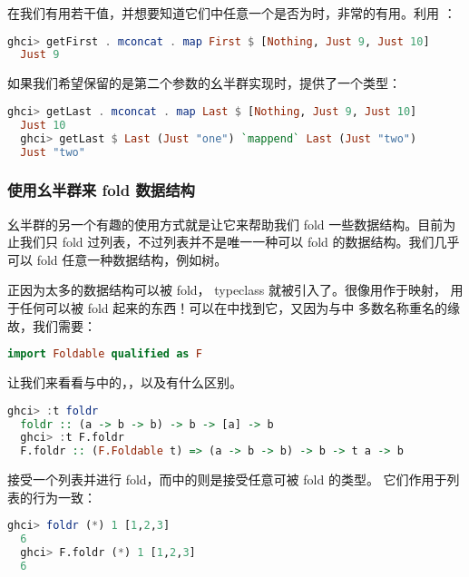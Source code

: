 \documentclass[./main.tex]{subfiles}
\begin{document}
在我们有用若干值，并想要知道它们中任意一个是否为时，非常的有用。利用
：

\begin{lstlisting}[language=Haskell]
  ghci> getFirst . mconcat . map First $ [Nothing, Just 9, Just 10]
  Just 9
\end{lstlisting}

如果我们希望保留的是第二个参数的幺半群实现时，提供了一个类型：

\begin{lstlisting}[language=Haskell]
  ghci> getLast . mconcat . map Last $ [Nothing, Just 9, Just 10]
  Just 10
  ghci> getLast $ Last (Just "one") `mappend` Last (Just "two")
  Just "two"
\end{lstlisting}

\subsubsection*{使用幺半群来 fold 数据结构}

幺半群的另一个有趣的使用方式就是让它来帮助我们 fold 一些数据结构。目前为止我们只 fold 过列表，不过列表并不是唯一一种可以
fold 的数据结构。我们几乎可以 fold 任意一种数据结构，例如树。

正因为太多的数据结构可以被 fold， typeclass 就被引入了。很像用作于映射，
用于任何可以被 fold 起来的东西！可以在中找到它，又因为与中
多数名称重名的缘故，我们需要：

\begin{lstlisting}[language=Haskell]
  import Foldable qualified as F
\end{lstlisting}

让我们来看看与中的，，以及有什么区别。

\begin{lstlisting}[language=Haskell]
  ghci> :t foldr
  foldr :: (a -> b -> b) -> b -> [a] -> b
  ghci> :t F.foldr
  F.foldr :: (F.Foldable t) => (a -> b -> b) -> b -> t a -> b
\end{lstlisting}

接受一个列表并进行 fold，而中的则是接受任意可被 fold 的类型。
它们作用于列表的行为一致：

\begin{lstlisting}[language=Haskell]
  ghci> foldr (*) 1 [1,2,3]
  6
  ghci> F.foldr (*) 1 [1,2,3]
  6
\end{lstlisting}
\end{document}
